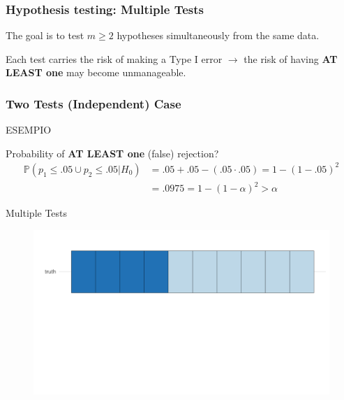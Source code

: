 \documentclass[xcolor={pdftex,dvipsnames,table}]{beamer}
\newcommand{\rbf}[1]{\textcolor{redUnipd}{ #1}}
\begin{document}
\begin{frame}
\frametitle{Hypothesis testing: Multiple Tests}

The goal is to test $m \ge 2$ hypotheses simultaneously from the same data.

\bigskip

Each test carries the risk of making a \rbf{Type I error} $\rightarrow$ the risk of having \textbf{ AT LEAST one} may become unmanageable.    
\end{frame}


\begin{frame}
\frametitle{Two Tests (Independent) Case}

ESEMPIO

\bigskip

Probability of \textbf{ AT LEAST one} (false) rejection?\
\bigskip
\begin{align*}
\mathbb{P}(p_1\leq .05 \cup p_2\leq .05 | H_0) &= 
.05+.05-(.05\cdot .05)=1-(1-.05)^2 \\
&=.0975=1-(1-\alpha)^2 > \alpha
\end{align*}


\end{frame}

\begin{frame}{Multiple Tests}
    \begin{figure}
        \centering
        \includegraphics[width = 1.1\textwidth]{Slides/MTP/plaatjes/mt1.pdf}

    \end{figure}
\end{frame}
\end{document}
